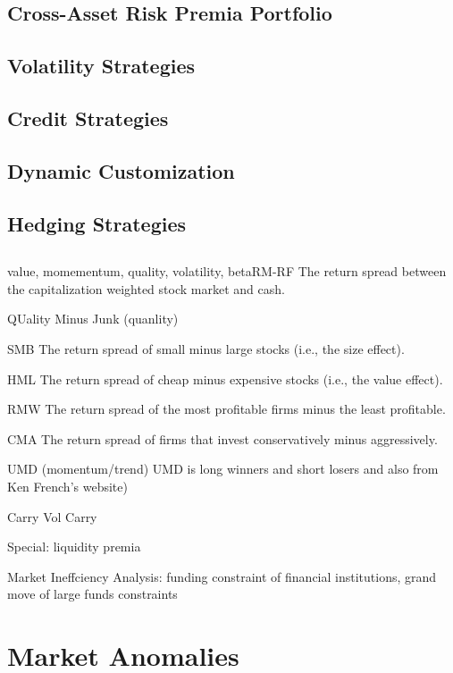 \documentclass[11pt, openany]{book}              %
\begin{document}
\subsection{Cross-Asset Risk Premia Portfolio}

\subsection{Volatility Strategies}

\subsection{Credit Strategies}

\subsection{Dynamic Customization}

\subsection{Hedging Strategies}



\subsection{}

value, momementum, quality, volatility, betaRM-RF  The return spread between the capitalization weighted stock market and cash.

QUality Minus Junk (quanlity)

SMB      The return spread of small minus large stocks (i.e., the size effect).

HML      The return spread of cheap minus expensive stocks (i.e., the value effect).

RMW     The return spread of the most profitable firms minus the least profitable.

CMA      The return spread of firms that invest conservatively minus aggressively.

UMD (momentum/trend) UMD is long winners and short losers and also from Ken French’s website)

Carry  Vol Carry


Special: liquidity premia 


Market Ineffciency Analysis: funding constraint of financial institutions, grand move of large funds constraints

\section{Market Anomalies}
\end{document}
